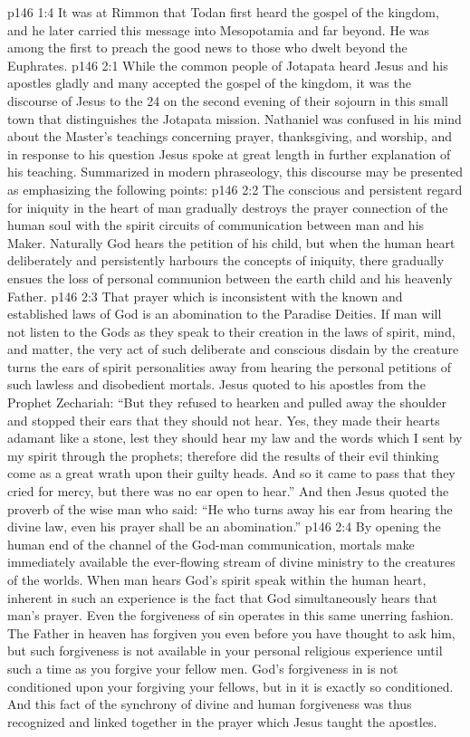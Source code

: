 \vs p146 1:4 \pc It was at Rimmon that Todan first heard the gospel of the kingdom, and he later carried this message into Mesopotamia and far beyond. He was among the first to preach the good news to those who dwelt beyond the Euphrates.
\vs p146 2:1 While the common people of Jotapata heard Jesus and his apostles gladly and many accepted the gospel of the kingdom, it was the discourse of Jesus to the 24 on the second evening of their sojourn in this small town that distinguishes the Jotapata mission. Nathaniel was confused in his mind about the Master’s teachings concerning prayer, thanksgiving, and worship, and in response to his question Jesus spoke at great length in further explanation of his teaching. Summarized in modern phraseology, this discourse may be presented as emphasizing the following points:
\vs p146 2:2 \bibnobreakspace The conscious and persistent regard for iniquity in the heart of man gradually destroys the prayer connection of the human soul with the spirit circuits of communication between man and his Maker. Naturally God hears the petition of his child, but when the human heart deliberately and persistently harbours the concepts of iniquity, there gradually ensues the loss of personal communion between the earth child and his heavenly Father.
\vs p146 2:3 \bibnobreakspace That prayer which is inconsistent with the known and established laws of God is an abomination to the Paradise Deities. If man will not listen to the Gods as they speak to their creation in the laws of spirit, mind, and matter, the very act of such deliberate and conscious disdain by the creature turns the ears of spirit personalities away from hearing the personal petitions of such lawless and disobedient mortals. Jesus quoted to his apostles from the Prophet Zechariah: “But they refused to hearken and pulled away the shoulder and stopped their ears that they should not hear. Yes, they made their hearts adamant like a stone, lest they should hear my law and the words which I sent by my spirit through the prophets; therefore did the results of their evil thinking come as a great wrath upon their guilty heads. And so it came to pass that they cried for mercy, but there was no ear open to hear.” And then Jesus quoted the proverb of the wise man who said: “He who turns away his ear from hearing the divine law, even his prayer shall be an abomination.”
\vs p146 2:4 \bibnobreakspace By opening the human end of the channel of the God\hyp{}man communication, mortals make immediately available the ever\hyp{}flowing stream of divine ministry to the creatures of the worlds. When man hears God’s spirit speak within the human heart, inherent in such an experience is the fact that God simultaneously hears that man’s prayer. Even the forgiveness of sin operates in this same unerring fashion. The Father in heaven has forgiven you even before you have thought to ask him, but such forgiveness is not available in your personal religious experience until such a time as you forgive your fellow men. God’s forgiveness in  is not conditioned upon your forgiving your fellows, but in  it is exactly so conditioned. And this fact of the synchrony of divine and human forgiveness was thus recognized and linked together in the prayer which Jesus taught the apostles.
